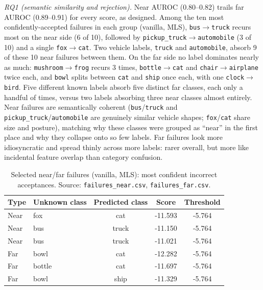 \documentclass{article}
\begin{document}
\emph{RQ1 (semantic similarity and rejection).} Near AUROC (0.80--0.82) trails far AUROC
(0.89--0.91) for every score, as designed. Among the ten most confidently-accepted failures in each
group (vanilla, MLS), \texttt{bus}$\to$\texttt{truck} recurs most on the near side (6 of 10),
followed by \texttt{pickup\_truck}$\to$\texttt{automobile} (3 of 10) and a single
\texttt{fox}$\to$\texttt{cat}. Two vehicle labels, \texttt{truck} and \texttt{automobile}, absorb 9
of these 10 near failures between them. On the far side no label dominates nearly as much:
\texttt{mushroom}$\to$\texttt{frog} recurs 3 times, \texttt{bottle}$\to$\texttt{cat} and
\texttt{chair}$\to$\texttt{airplane} twice each, and \texttt{bowl} splits between \texttt{cat} and
\texttt{ship} once each, with one \texttt{clock}$\to$\texttt{bird}. Five different known labels
absorb five distinct far classes, each only a handful of times, versus two labels absorbing three
near classes almost entirely. Near failures are semantically coherent (\texttt{bus}/\texttt{truck}
and \texttt{pickup\_truck}/\texttt{automobile} are genuinely similar vehicle shapes;
\texttt{fox}/\texttt{cat} share size and posture), matching why these classes were grouped as
``near'' in the first place and why they collapse onto so few labels. Far failures look more
idiosyncratic and spread thinly across more labels: rarer overall, but more like incidental feature
overlap than category confusion.

\begin{table}[h]
  \centering
  \caption{Selected near/far failures (vanilla, MLS): most confident incorrect acceptances. Source: \texttt{failures\_near.csv}, \texttt{failures\_far.csv}.}
  \label{tab:task4-failures}
  \small
  \begin{tabular}{llccc}
    \toprule
    Type & Unknown class & Predicted class & Score & Threshold \\
    \midrule
    Near & fox           & cat      & -11.593 & -5.764 \\
    Near & bus           & truck    & -11.150 & -5.764 \\
    Near & bus           & truck    & -11.021 & -5.764 \\
    Far  & bowl          & cat      & -12.282 & -5.764 \\
    Far  & bottle        & cat      & -11.697 & -5.764 \\
    Far  & bowl          & ship     & -11.329 & -5.764 \\
    \bottomrule
  \end{tabular}
\end{table}
\end{document}

